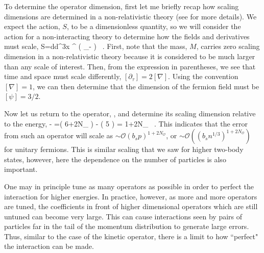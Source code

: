 To determine the operator dimension, first let me briefly recap how scaling dimensions are determined in a non-relativistic theory (see \cite{Kaplan:2005es} for more details). We expect the action, $S$, to be a dimensionless quantity, so we will consider the action for a non-interacting theory to determine how the fields and derivatives must scale,
\beq
S=\int d\tau d^3x \psi^{\dagger} \left( \partial_{\tau}- \right) \psi \ .
\eeq
First, note that the mass, $M$, carries zero scaling dimension in a non-relativistic theory because it is considered to be much larger than any scale of interest. Then, from the expression in parentheses, we see that time and space must scale differently, $[\partial_{\tau}] = 2 [\nabla]$. Using the convention $[\nabla]=1$, we can then determine that the dimension of the fermion field must be $[\psi]=3/2$. 

Now let us return to the operator, , and determine its scaling dimension relative to the energy,
\beq
{} - \left[\psi^{\dagger} \partial_{\tau} \psi \right] =( 6+2N_{{}} ) - ( 5 ) = 1+2N_{{}} \ .
\eeq
This indicates that the error from such an operator will scale as $\sim {\mathcal{ O}}(b_s p)^{1+2N_{{\mathcal{ O}}}}$, or $\sim {\mathcal{ O}}\left((b_s n^{1/3})^{1+2N_{{\mathcal{ O}}}}\right)$ for unitary fermions. This is similar scaling that we saw for higher two-body states, however, here the dependence on the number of particles is also important.

One may in principle tune as many operators as possible in order to perfect the interaction for higher energies. In practice, however, as more and more operators are tuned, the coefficients in front of higher dimensional operators which are still untuned can become very large. This can cause interactions seen by pairs of particles far in the tail of the momentum distribution to generate large errors. Thus, similar to the case of the kinetic operator, there is a limit to how ``perfect" the interaction can be made. 

